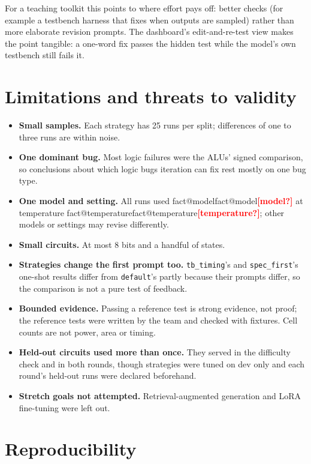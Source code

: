 \documentclass[11pt,a4paper]{article}
\makeatletter
\newcommand{\fact}[1]{\ifcsname fact@#1\endcsname\csname fact@#1\endcsname\else\textcolor{red}{\textbf{[#1?]}}\fi}
\makeatother
\begin{document}
For a teaching toolkit this points to where effort pays off: better checks (for example a testbench harness that
fixes when outputs are sampled) rather than more elaborate revision prompts. The dashboard's edit-and-re-test view
makes the point tangible: a one-word fix passes the hidden test while the model's own testbench still fails it.

\section{Limitations and threats to validity}

\begin{itemize}
  \item \textbf{Small samples.} Each strategy has 25 runs per split; differences of one to three runs are within noise.
  \item \textbf{One dominant bug.} Most logic failures were the ALUs' signed comparison, so conclusions about which
        logic bugs iteration can fix rest mostly on one bug type.
  \item \textbf{One model and setting.} All runs used \fact{model} at temperature \fact{temperature}; other models or
        settings may revise differently.
  \item \textbf{Small circuits.} At most 8 bits and a handful of states.
  \item \textbf{Strategies change the first prompt too.} \texttt{tb\_timing}'s and \texttt{spec\_first}'s one-shot
        results differ from \texttt{default}'s partly because their prompts differ, so the comparison is not a pure test
        of feedback.
  \item \textbf{Bounded evidence.} Passing a reference test is strong evidence, not proof; the reference tests were
        written by the team and checked with fixtures. Cell counts are not power, area or timing.
  \item \textbf{Held-out circuits used more than once.} They served in the difficulty check and in both rounds, though
        strategies were tuned on dev only and each round's held-out runs were declared beforehand.
  \item \textbf{Stretch goals not attempted.} Retrieval-augmented generation and LoRA fine-tuning were left out.
\end{itemize}

\section{Reproducibility}
\end{document}
